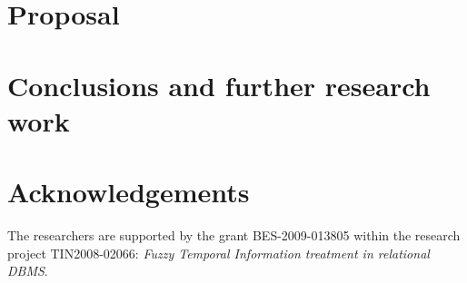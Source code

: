 \documentclass{llncs}
\begin{document}
\section{Proposal}
\label{sec:proposal}



%
%
%
\section{Conclusions and further research work}
\label{sec:futher-research}

%




%
\section*{Acknowledgements}
%
The researchers are supported by the grant BES-2009-013805 within the research project TIN2008-02066: \emph{Fuzzy Temporal Information treatment in relational DBMS}.




\end{document}
